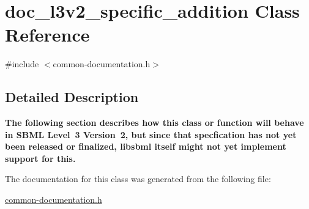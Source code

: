 \hypertarget{classdoc__l3v2__specific__addition}{}\section{doc\+\_\+l3v2\+\_\+specific\+\_\+addition Class Reference}
\label{classdoc__l3v2__specific__addition}


{\ttfamily \#include $<$common-\/documentation.\+h$>$}



\subsection{Detailed Description}
\begin{DoxyParagraph}{}
{\bfseries The following section describes how this class or function will behave in S\+B\+ML Level~3 Version~2, but since that specfication has not yet been released or finalized, libsbml itself might not yet implement support for this.} 
\end{DoxyParagraph}


The documentation for this class was generated from the following file\+:\begin{DoxyCompactItemize}
\item 
\hyperlink{common-documentation_8h}{common-\/documentation.\+h}\end{DoxyCompactItemize}
